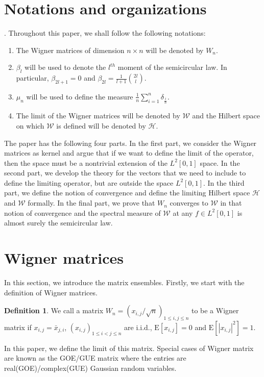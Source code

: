 \documentclass[reqno,12pt]{amsart}
\theoremstyle{plain}
\theoremstyle{definition}
\newtheorem{definition}{Definition}
\begin{document}
\section{Notations and organizations}.
Throughout this paper, we shall follow the following notations: 
\begin{enumerate}
    \item The Wigner matrices of dimension $n \times n$ will be denoted by $W_{n}$.
    \item $\beta_{l}$ will be used to denote the $l^{th}$ moment of the semicircular law. In particular, $\beta_{2l+1}=0$ and $\beta_{2l}= \frac{1}{l+1}\binom{2l}{l}$.
    \item $\mu_{n}$ will be used to define the measure $\frac{1}{n} \sum_{i=1}^{n} \delta_{\frac{i}{n}}$.
    \item The limit of the Wigner matrices will be denoted by $\mathcal{W}$ and the Hilbert space on which $\mathcal{W}$ is defined will be denoted by $\mathcal{H}$.
\end{enumerate}
The paper has the following four parts. In the first part, we consider the Wigner matrices as kernel and argue that if we want to define the limit of the operator, then the space must be a nontrivial extension of the $L^{2}[0,1]$ space. In the second part, we develop the theory for the vectors that we need to include to define the limiting operator, but are outside the space $L^{2}[0,1]$. In the third part, we define the notion of convergence and define the limiting Hilbert space $\mathcal{H}$ and $\mathcal{W}$ formally. In the final part, we prove that $W_{n}$ converges to $\mathcal{W}$ in that notion of convergence and the spectral measure of $\mathcal{W}$ at any $f\in L^{2}[0,1]$ is almost surely the semicircular law. 


\section{Wigner matrices}\label{sec:wig}
 In this section, we introduce the matrix ensembles. Firstly, we start with the definition of Wigner matrices. 
 \begin{definition}\label{def:wig}
 We call a matrix $W_{n}= \left( x_{i,j}/ \sqrt{n} \right)_{1\le i,j \le n}$ to be a Wigner matrix if $x_{i,j}=\bar{x}_{j,i}$, $\left(x_{i,j}\right)_{1\le i<j\le n}$ are i.i.d., $\mathrm{E}[x_{i,j}]=0$ and $\mathrm{E}[|x_{i,j}|^2]=1$. 
 \end{definition}
 In this paper, we define the limit of this matrix. Special cases of Wigner matrix are known as the GOE/GUE matrix where the entries are real(GOE)/complex(GUE) Gaussian random variables.
 
\end{document}
